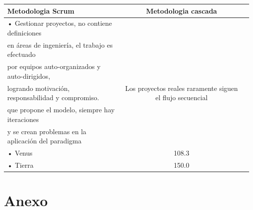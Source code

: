 \documentclass[10pt]{article}
\begin{document}
\begin{tabular}{|lc|l|} \hline
\multicolumn{1}{|p{5cm}|}{\centering %
Metodologia Scrum} & \multicolumn{1}{|p{5cm}|}{\centering %
Metodologia cascada} \tabularnewline \hline
 • Gestionar  proyectos, no contiene definiciones\\ 
en áreas de ingeniería, el trabajo es efectuado\\ 
por equipos auto-organizados y auto-dirigidos, \\
logrando motivación, responsabilidad y compromiso.  &  Los proyectos reales raramente siguen el flujo secuencial\\
que propone el modelo, siempre hay iteraciones\\
y se crean problemas en la aplicación del paradigma \\
 • Venus & 108.3 \\ 
 • Tierra & 150.0 \\ \hline
\end{tabular}





\section{Anexo}
\end{document}
